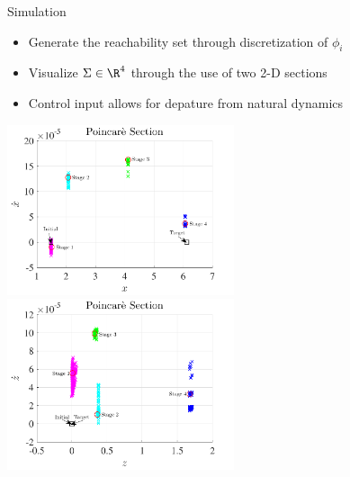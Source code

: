 \begin{frame}{Simulation}

\begin{itemize}
    \item Generate the reachability set through discretization of \( \phi_i \)
    \item Visualize \( \Sigma \in \R^4 \) through the use of two 2-D sections
    \pause
    \item Control input allows for depature from natural dynamics
\end{itemize}

\begin{center}
    \includegraphics[width=0.5\textwidth,height=0.7\textheight,keepaspectratio]{figures/2016AAS/poincare_xvsxdot.pdf}~
    \includegraphics[width=0.5\textwidth,height=0.7\textheight,keepaspectratio]{figures/2016AAS/poincare_zvszdot.pdf}
\end{center}

\end{frame}

